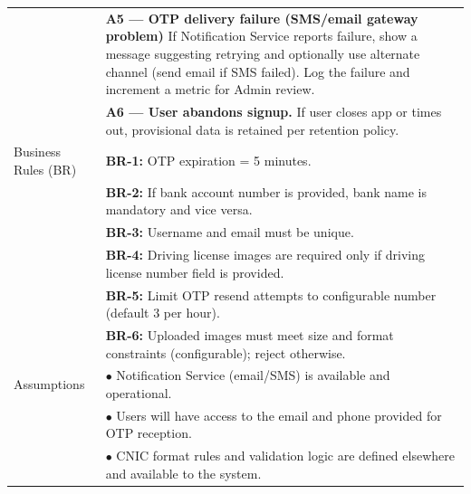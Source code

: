 \begin{longtable}{|>{\raggedright\arraybackslash}p{4cm}|>{\raggedright\arraybackslash}p{11cm}|}
& \textbf{A5 — OTP delivery failure (SMS/email gateway problem)} \newline If Notification Service reports failure, show a message suggesting retrying and optionally use alternate channel (send email if SMS failed). Log the failure and increment a metric for Admin review. \\
& \textbf{A6 — User abandons signup.} \newline If user closes app or times out, provisional data is retained per retention policy. \\
\hline
Business Rules (BR) & \textbf{BR-1:} OTP expiration = 5 minutes. \\
& \textbf{BR-2:} If bank account number is provided, bank name is mandatory and vice versa. \\
& \textbf{BR-3:} Username and email must be unique. \\
& \textbf{BR-4:} Driving license images are required only if driving license number field is provided. \\
& \textbf{BR-5:} Limit OTP resend attempts to configurable number (default 3 per hour). \\
& \textbf{BR-6:} Uploaded images must meet size and format constraints (configurable); reject otherwise. \\
\hline
Assumptions & $\bullet$ Notification Service (email/SMS) is available and operational. \\
& $\bullet$ Users will have access to the email and phone provided for OTP reception. \\
& $\bullet$ CNIC format rules and validation logic are defined elsewhere and available to the system. \\
\end{longtable}

